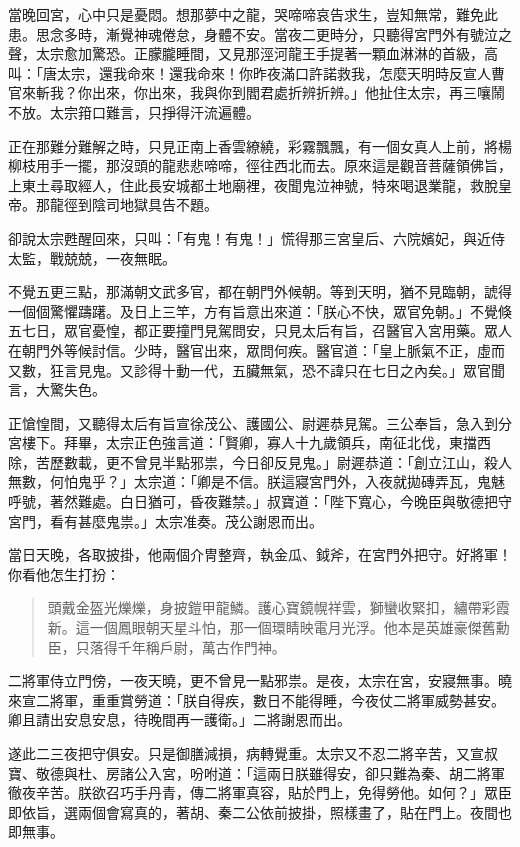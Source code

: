 當晚回宮，心中只是憂悶。想那夢中之龍，哭啼啼哀告求生，豈知無常，難免此患。思念多時，漸覺神魂倦怠，身體不安。當夜二更時分，只聽得宮門外有號泣之聲，太宗愈加驚恐。正朦朧睡間，又見那涇河龍王手提著一顆血淋淋的首級，高叫：「唐太宗，還我命來！還我命來！你昨夜滿口許諾救我，怎麼天明時反宣人曹官來斬我？你出來，你出來，我與你到閻君處折辨折辨。」他扯住太宗，再三嚷鬧不放。太宗箝口難言，只掙得汗流遍體。

正在那難分難解之時，只見正南上香雲繚繞，彩霧飄飄，有一個女真人上前，將楊柳枝用手一擺，那沒頭的龍悲悲啼啼，徑往西北而去。原來這是觀音菩薩領佛旨，上東土尋取經人，住此長安城都土地廟裡，夜聞鬼泣神號，特來喝退業龍，救脫皇帝。那龍徑到陰司地獄具告不題。

卻說太宗甦醒回來，只叫：「有鬼！有鬼！」慌得那三宮皇后、六院嬪妃，與近侍太監，戰兢兢，一夜無眠。

不覺五更三點，那滿朝文武多官，都在朝門外候朝。等到天明，猶不見臨朝，諕得一個個驚懼躊躇。及日上三竿，方有旨意出來道：「朕心不快，眾官免朝。」不覺倏五七日，眾官憂惶，都正要撞門見駕問安，只見太后有旨，召醫官入宮用藥。眾人在朝門外等候討信。少時，醫官出來，眾問何疾。醫官道：「皇上脈氣不正，虛而又數，狂言見鬼。又診得十動一代，五臟無氣，恐不諱只在七日之內矣。」眾官聞言，大驚失色。

正愴惶間，又聽得太后有旨宣徐茂公、護國公、尉遲恭見駕。三公奉旨，急入到分宮樓下。拜畢，太宗正色強言道：「賢卿，寡人十九歲領兵，南征北伐，東擋西除，苦歷數載，更不曾見半點邪祟，今日卻反見鬼。」尉遲恭道：「創立江山，殺人無數，何怕鬼乎？」太宗道：「卿是不信。朕這寢宮門外，入夜就拋磚弄瓦，鬼魅呼號，著然難處。白日猶可，昏夜難禁。」叔寶道：「陛下寬心，今晚臣與敬德把守宮門，看有甚麼鬼祟。」太宗准奏。茂公謝恩而出。

當日天晚，各取披掛，他兩個介冑整齊，執金瓜、鉞斧，在宮門外把守。好將軍！你看他怎生打扮：
\begin{quote}
頭戴金盔光爍爍，身披鎧甲龍鱗。護心寶鏡幌祥雲，獅蠻收緊扣，繡帶彩霞新。這一個鳳眼朝天星斗怕，那一個環睛映電月光浮。他本是英雄豪傑舊勳臣，只落得千年稱戶尉，萬古作門神。
\end{quote}

二將軍侍立門傍，一夜天曉，更不曾見一點邪祟。是夜，太宗在宮，安寢無事。曉來宣二將軍，重重賞勞道：「朕自得疾，數日不能得睡，今夜仗二將軍威勢甚安。卿且請出安息安息，待晚間再一護衛。」二將謝恩而出。

遂此二三夜把守俱安。只是御膳減損，病轉覺重。太宗又不忍二將辛苦，又宣叔寶、敬德與杜、房諸公入宮，吩咐道：「這兩日朕雖得安，卻只難為秦、胡二將軍徹夜辛苦。朕欲召巧手丹青，傳二將軍真容，貼於門上，免得勞他。如何？」眾臣即依旨，選兩個會寫真的，著胡、秦二公依前披掛，照樣畫了，貼在門上。夜間也即無事。

